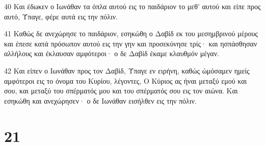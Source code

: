 \par 40 Και έδωκεν ο Ιωνάθαν τα όπλα αυτού εις το παιδάριον το μεθ' αυτού και είπε προς αυτό, Ύπαγε, φέρε αυτά εις την πόλιν.
\par 41 Καθώς δε ανεχώρησε το παιδάριον, εσηκώθη ο Δαβίδ εκ του μεσημβρινού μέρους και έπεσε κατά πρόσωπον αυτού εις την γην και προσεκύνησε τρίς· και ησπάσθησαν αλλήλους και έκλαυσαν αμφότεροι· ο δε Δαβίδ έκαμε κλαυθμόν μέγαν.
\par 42 Και είπεν ο Ιωνάθαν προς τον Δαβίδ, Ύπαγε εν ειρήνη, καθώς ώμόσαμεν ημείς αμφότεροι εις το όνομα του Κυρίου, λέγοντες, Ο Κύριος ας ήναι μεταξύ εμού και σου, και μεταξύ του σπέρματός μου και του σπέρματός σου εις τον αιώνα. Και εσηκώθη και ανεχώρησεν· ο δε Ιωνάθαν εισήλθεν εις την πόλιν.

\chapter{21}

